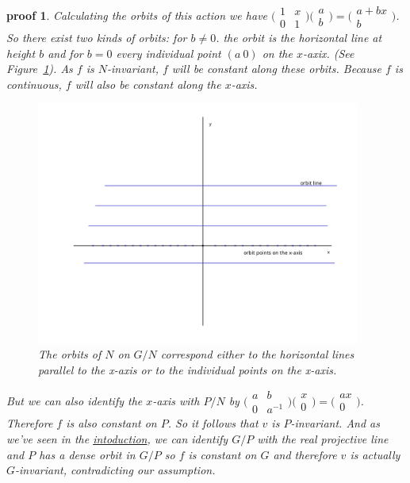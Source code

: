 \documentclass[
]{article}
\theoremstyle{break}
\theoremstyle{plain}
\newtheorem*{pf}{proof}
\newcommand{\G}{\ensuremath{G}}
\newcommand{\Ninv}{$N$-invariant}
\newcommand{\ipmatrix}[1]{%
\ensuremath{\big(\begin{smallmatrix} #1 \end{smallmatrix}\big)}}
\begin{document}
\begin{pf}
  Calculating the orbits of this action we have $\ipmatrix{1 & x \\ 0 &
  1}\ipmatrix{a \\ b} = \ipmatrix{a +bx \\ b}$. So there exist two kinds of
  orbits: for $b \neq 0$. the orbit is the horizontal line at height $b$ and
  for $b=0$ every individual point $(a\ 0)$ on the $x$-axix. (See Figure~\ref{fig:n-orbits-in-r2}). As $f$ is \Ninv,
  $f$ will be constant along these orbits. Because $f$ is continuous, $f$ will
  also be constant along the $x$-axis.

  \begin{figure}
    \begin{center}
      \includegraphics[width=0.95\textwidth]{N-orbits-in-R2-1.png}
    \end{center}
    \caption{The orbits of $N$ on $G/N$ correspond either to the horizontal lines parallel to the x-axis or to the individual points on the x-axis. }
    \label{fig:n-orbits-in-r2}
  \end{figure}

  But we can also identify the $x$-axis with $P/N$ by $\ipmatrix{a & b \\ 0 &
  a^{-1}}\ipmatrix{x \\ 0} = \ipmatrix{ax \\ 0}$. Therefore $f$ is also
  constant on $P$. So it follows that $v$ is $P$-invariant. And as we've seen
  in the \hyperref[sec:introduction]{intoduction}, we can identify $G/P$ with
  the real projective line and $P$ has a dense orbit in $G/P$ so $f$ is
  constant on $G$ and therefore $v$ is actually \G-invariant, contradicting our
  assumption.
\end{pf}
\end{document}
